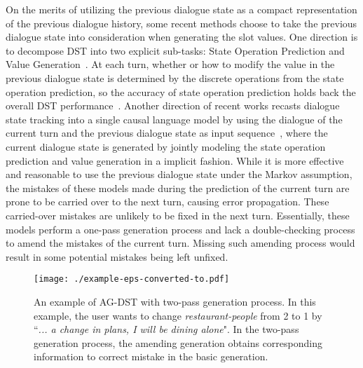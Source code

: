 \documentclass[11pt]{article}
\begin{document}
On the merits of utilizing the previous dialogue state as a compact representation of the previous dialogue history, some recent methods choose to take the previous dialogue state into consideration when generating the slot values. One direction is to decompose DST into two explicit sub-tasks: State Operation Prediction and Value Generation~\citep{kim-etal-2020-efficient,zeng2020multi}.
At each turn, whether or how to modify the value in the previous dialogue state is determined by the discrete operations from the state operation prediction, so the accuracy of state operation prediction holds back the overall DST performance~\citep{kim-etal-2020-efficient}. 
Another direction of recent works recasts dialogue state tracking into a single causal language model by using the dialogue of the current turn and the previous dialogue state as input sequence~\citep{lin-etal-2020-mintl,yang2021ubar}, where the current dialogue state is generated by jointly modeling the state operation prediction and value generation in a implicit fashion.
While it is more effective and reasonable to use the previous dialogue state under the Markov assumption, the mistakes of these models made during the prediction of the current turn are prone to be carried over to the next turn, causing error propagation. These carried-over mistakes are unlikely to be fixed in the next turn. Essentially, these models perform a one-pass generation process and lack a double-checking process to amend the mistakes of the current turn. Missing such amending process would result in some potential mistakes being left unfixed.






\begin{figure*}
	\centering
	\texttt{[image: ./example-eps-converted-to.pdf]}
	\caption{An example of AG-DST with two-pass generation process. In this example, the user wants to change \textit{restaurant-people} from 2 to 1 by ``\textit{... a change in plans, I will be dining alone}". In the two-pass generation process, the amending generation obtains corresponding information to correct mistake in the basic generation.}
	\label{fig:example}
\end{figure*} 
\end{document}
